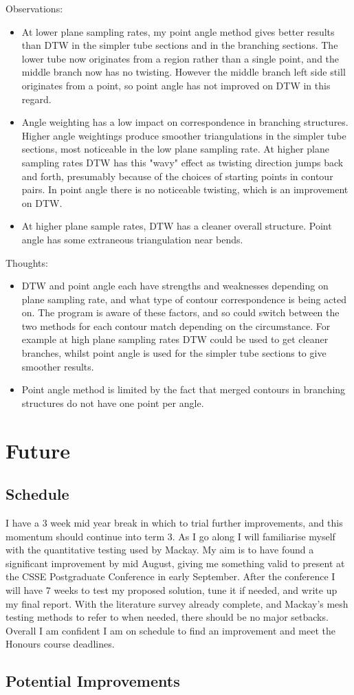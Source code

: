 \documentclass[11pt]{article}
\begin{document}
Observations:
\begin{itemize}
\item At lower plane sampling rates, my point angle method gives better results than DTW in the simpler tube sections and in the branching sections. The lower tube now originates from a region rather than a single point, and the middle branch now has no twisting. However the middle branch left side still originates from a point, so point angle has not improved on DTW in this regard.
\item Angle weighting has a low impact on correspondence in branching structures. Higher angle weightings produce smoother triangulations in the simpler tube sections, most noticeable in the low plane sampling rate. At higher plane sampling rates DTW has this "wavy" effect as twisting direction jumps back and forth, presumably because of the choices of starting points in contour pairs. In point angle there is no noticeable twisting, which is an improvement on DTW.
\item At higher plane sample rates, DTW has a cleaner overall structure. Point angle has some extraneous triangulation near bends.
\end{itemize}

Thoughts:
\begin{itemize}
\item DTW and point angle each have strengths and weaknesses depending on plane sampling rate, and what type of contour correspondence is being acted on. The program is aware of these factors, and so could switch between the two methods for each contour match depending on the circumstance. For example at high plane sampling rates DTW could be used to get cleaner branches, whilst point angle is used for the simpler tube sections to give smoother results.
\item Point angle method is limited by the fact that merged contours in branching structures do not have one point per angle.
\end{itemize}

\section{Future}

\subsection{Schedule}

I have a 3 week mid year break in which to trial further improvements, and this momentum should continue into term 3. As I go along I will familiarise myself with the quantitative testing used by Mackay. My aim is to have found a significant improvement by mid August, giving me something valid to present at the CSSE Postgraduate Conference in early September. After the conference I will have 7 weeks to test my proposed solution, tune it if needed, and write up my final report. With the literature survey already complete, and Mackay's mesh testing methods to refer to when needed, there should be no major setbacks. Overall I am confident I am on schedule to find an improvement and meet the Honours course deadlines.

\subsection{Potential Improvements}

\pagebreak


\end{document}
